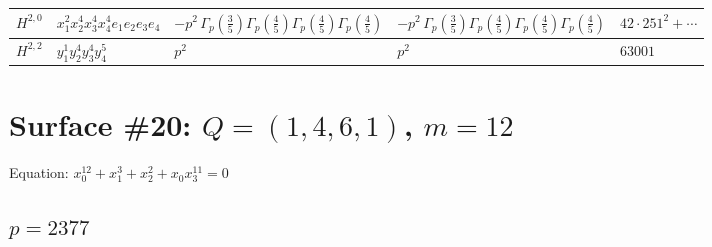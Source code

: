 \documentclass[11pt]{article}
\begin{document}
\begin{table}[ht]
{\begin{tabular}{@{}lllll@{}}
$H^{2,0}$ & $x_{1}^{2} x_{2}^{4} x_{3}^{4} x_{4}^{4}  e_{1} e_{2} e_{3} e_{4}$ & $- p^{2} \, \Gamma_p \left( \frac{3}{5} \right) \Gamma_p \left( \frac{4}{5} \right) \Gamma_p \left( \frac{4}{5} \right) \Gamma_p \left( \frac{4}{5} \right)$ & $- p^{2} \, \Gamma_p \left( \frac{3}{5} \right) \Gamma_p \left( \frac{4}{5} \right) \Gamma_p \left( \frac{4}{5} \right) \Gamma_p \left( \frac{4}{5} \right)$ & $42{\cdot}251^{2}{+}\cdots$ \\
\midrule
$H^{2,2}$ & $y_{1}^{1} y_{2}^{4} y_{3}^{4} y_{4}^{5}$ & $p^{2} \,$ & $p^{2} \,$ & $63001$ \\
\bottomrule
\end{tabular}
}
\renewcommand{\arraystretch}{1.0}
\end{table}

\newpage

\section*{Surface \#20: $Q=(1, 4, 6, 1)$, $m=12$}

Equation: $x_0^{12} + x_1^{3} + x_2^{2} + x_0 x_3^{11} = 0$

\subsection*{$p = 2377$}
\end{document}
